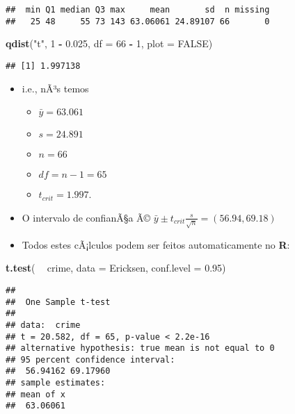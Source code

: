 \documentclass[]{article}
\newenvironment{Shaded}{\begin{snugshade}}{\end{snugshade}}
\newcommand{\KeywordTok}[1]{\textcolor[rgb]{0.13,0.29,0.53}{\textbf{#1}}}
\newcommand{\DataTypeTok}[1]{\textcolor[rgb]{0.13,0.29,0.53}{#1}}
\newcommand{\DecValTok}[1]{\textcolor[rgb]{0.00,0.00,0.81}{#1}}
\newcommand{\FloatTok}[1]{\textcolor[rgb]{0.00,0.00,0.81}{#1}}
\newcommand{\StringTok}[1]{\textcolor[rgb]{0.31,0.60,0.02}{#1}}
\newcommand{\OtherTok}[1]{\textcolor[rgb]{0.56,0.35,0.01}{#1}}
\newcommand{\OperatorTok}[1]{\textcolor[rgb]{0.81,0.36,0.00}{\textbf{#1}}}
\newcommand{\NormalTok}[1]{#1}
\providecommand{\tightlist}{%
  \setlength{\itemsep}{0pt}\setlength{\parskip}{0pt}}
\begin{document}
\begin{verbatim}
##  min Q1 median Q3 max     mean       sd  n missing
##   25 48     55 73 143 63.06061 24.89107 66       0
\end{verbatim}

\begin{Shaded}
\begin{Highlighting}[]
\KeywordTok{qdist}\NormalTok{(}\StringTok{"t"}\NormalTok{, }\DecValTok{1} \OperatorTok{-}\StringTok{ }\FloatTok{0.025}\NormalTok{, }\DataTypeTok{df =} \DecValTok{66} \OperatorTok{-}\StringTok{ }\DecValTok{1}\NormalTok{, }\DataTypeTok{plot =} \OtherTok{FALSE}\NormalTok{)}
\end{Highlighting}
\end{Shaded}

\begin{verbatim}
## [1] 1.997138
\end{verbatim}

\begin{itemize}
\tightlist
\item
  i.e., nÃ³s temos

  \begin{itemize}
  \tightlist
  \item
    \(\bar{y} = 63.061\)
  \item
    \(s = 24.891\)
  \item
    \(n = 66\)
  \item
    \(df = n-1 = 65\)
  \item
    \(t_{crit} = 1.997\).
  \end{itemize}
\item
  O intervalo de confianÃ§a Ã©
  \(\bar{y}\pm t_{crit}\frac{s}{\sqrt{n}} =  (56.94 ,  69.18)\)
\item
  Todos estes cÃ¡lculos podem ser feitos automaticamente no \textbf{R}:
\end{itemize}

\begin{Shaded}
\begin{Highlighting}[]
\KeywordTok{t.test}\NormalTok{( }\OperatorTok{~}\StringTok{ }\NormalTok{crime, }\DataTypeTok{data =}\NormalTok{ Ericksen, }\DataTypeTok{conf.level =} \FloatTok{0.95}\NormalTok{)}
\end{Highlighting}
\end{Shaded}

\begin{verbatim}
## 
##  One Sample t-test
## 
## data:  crime
## t = 20.582, df = 65, p-value < 2.2e-16
## alternative hypothesis: true mean is not equal to 0
## 95 percent confidence interval:
##  56.94162 69.17960
## sample estimates:
## mean of x 
##  63.06061
\end{verbatim}
\end{document}
